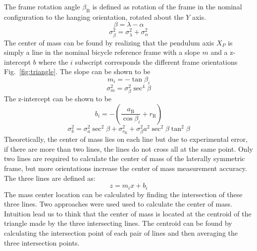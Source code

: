 \documentclass{bmd2010p}
\begin{document}
The frame rotation angle $\beta_\mathrm{B}$ is defined as rotation of the frame in the
nominal configuration to the hanging orientation, rotated about the $Y$ axis.
\begin{equation}
    \beta=\lambda-\alpha
    \label{eq:frameRotAng}
\end{equation}
\begin{equation}
    \sigma_{\beta}^{2} = \sigma_{\lambda}^{2} + \sigma_{\alpha}^{2}
    \label{eq:FrameRotAngVar}
\end{equation}
The center of mass can be found by realizing that the pendulum axis $X_P$ is
simply a line in the nominal bicycle reference frame with a slope $m$ and a
z-intercept $b$ where the $i$ subscript corresponds the different frame
orientations Fig.~\ref{fig:triangle}. The slope can be shown to be
\begin{equation}
	m_i=-\tan{\beta_i}
\label{eq:slope}
\end{equation}
\begin{equation}
    \sigma_{m}^{2} = \sigma_{\beta}^{2}\sec^{4}{\beta}
    \label{eq:SlopeVar}
\end{equation}
The z-intercept can be shown to be
\begin{equation}
    b_i=-\left(\frac{a_\mathrm{B}}{\cos{\beta_i}}+r_\mathrm{R}\right)
    \label{eq:zInt}
\end{equation}
\begin{equation}
    \sigma_{b}^{2} = \sigma_{a}^{2}\sec^{2}{\beta} +
    \sigma_{r_\mathrm{R}}^{2} +
    \sigma_{\beta}^{2}a^{2}\sec^{2}{\beta}\tan^{2}{\beta}
    \label{eq:zIntvar}
\end{equation}
Theoretically, the center of mass lies on each line but due to experimental
error, if there are more than two lines, the lines do not cross all at the same point. Only two lines
are required to calculate the center of mass of the laterally
symmetric frame, but more orientations increase the center of mass measurement
accuracy. The three lines are defined as:
\begin{equation}
   z = m_ix+b_i
   \label{eq:line}
\end{equation}
The mass center location can be calculated by finding the intersection of these three
lines. Two approaches were used used to calculate the center of mass. Intuition
lead us to think that the center of mass is located at the centroid of the
triangle made by the three intersecting lines. The centroid can be found by
calculating the intersection point of each pair of lines and then averaging the
three intersection points.
\end{document}
